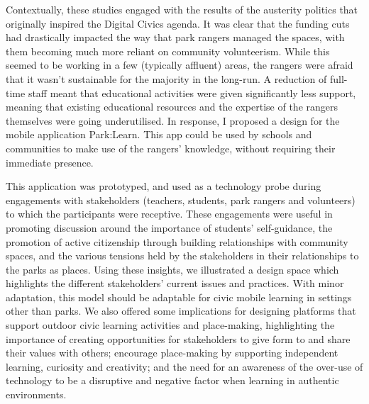 Contextually, these studies engaged with the results of the austerity politics that originally inspired the Digital Civics agenda. It was clear that the funding cuts had drastically impacted the way that park rangers managed the spaces, with them becoming much more reliant on community volunteerism. While this seemed to be working in a few (typically affluent) areas, the rangers were afraid that it wasn't sustainable for the majority in the long-run. A reduction of full-time staff meant that educational activities were given significantly less support, meaning that existing educational resources and the expertise of the rangers themselves were going underutilised. In response, I proposed a design for the mobile application Park:Learn. This app could be used by schools and communities to make use of the rangers' knowledge, without requiring their immediate presence.

This application was prototyped, and used as a technology probe during engagements with stakeholders (teachers, students, park rangers and volunteers) to which the participants were receptive. These engagements were useful in promoting discussion around the importance of students' self-guidance, the promotion of active citizenship through building relationships with community spaces, and the various tensions held by the stakeholders in their relationships to the parks as places. Using these insights, we illustrated a design space which highlights the different stakeholders’ current issues and practices. With minor adaptation, this model should be adaptable for civic mobile learning in settings other than parks. We also offered some implications for designing platforms that support outdoor civic learning activities and place-making, highlighting the importance of creating opportunities for stakeholders to give form to and share their values with others; encourage place-making by supporting independent learning, curiosity and creativity; and the need for an awareness of the over-use of technology to be a disruptive and negative factor when learning in authentic environments.

